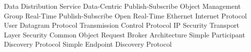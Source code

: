      {Data Distribution Service}
    {Data-Centric Publish-Subscribe}
     {Object Management Group}
    {Real-Time Publish-Subscribe}
    {Open Real-Time Ethernet}
      {Internet Protocol}
     {User Datagram Protocol}
     {Transmission Control Protocol}
   {IP Security}
     {Transport Layer Security}
   {Common Object Request Broker Architecture}
    {Simple Participant Discovery Protocol}
    {Simple Endpoint Discovery Protocol}
